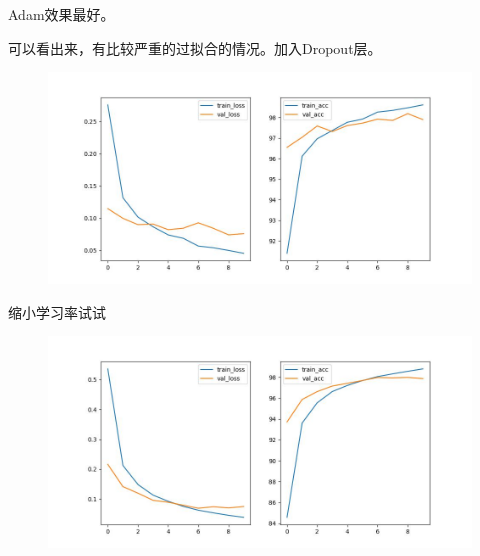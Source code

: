 \documentclass[UTF8]{ctexart}
\begin{document}
Adam效果最好。

可以看出来，有比较严重的过拟合的情况。加入Dropout层。
\begin{figure}[H]
\centering
\includegraphics[scale=0.5]{with_dropout.jpg}
\end{figure}

缩小学习率试试
\begin{figure}[H]
\centering
\includegraphics[scale=0.5]{with_dropout_smaller_lr.jpg}
\end{figure}
\end{document}
